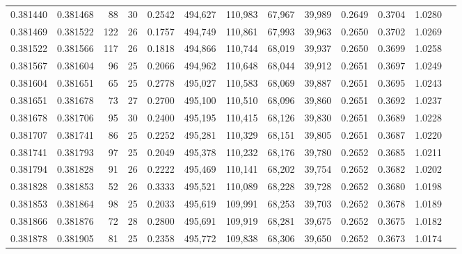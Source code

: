 \begin{tabular}{rrrrrrrrrrrrr}
0.381440 & 0.381468 &    88 &  30 &                                     0.2542 & 494,627 & 110,983 &  67,967 &  39,989 & 0.2649 & 0.3704 & 1.0280 \\
0.381469 & 0.381522 &   122 &  26 &                                     0.1757 & 494,749 & 110,861 &  67,993 &  39,963 & 0.2650 & 0.3702 & 1.0269 \\
0.381522 & 0.381566 &   117 &  26 &                                     0.1818 & 494,866 & 110,744 &  68,019 &  39,937 & 0.2650 & 0.3699 & 1.0258 \\
0.381567 & 0.381604 &    96 &  25 &                                     0.2066 & 494,962 & 110,648 &  68,044 &  39,912 & 0.2651 & 0.3697 & 1.0249 \\
0.381604 & 0.381651 &    65 &  25 &                                     0.2778 & 495,027 & 110,583 &  68,069 &  39,887 & 0.2651 & 0.3695 & 1.0243 \\
0.381651 & 0.381678 &    73 &  27 &                                     0.2700 & 495,100 & 110,510 &  68,096 &  39,860 & 0.2651 & 0.3692 & 1.0237 \\
0.381678 & 0.381706 &    95 &  30 &                                     0.2400 & 495,195 & 110,415 &  68,126 &  39,830 & 0.2651 & 0.3689 & 1.0228 \\
0.381707 & 0.381741 &    86 &  25 &                                     0.2252 & 495,281 & 110,329 &  68,151 &  39,805 & 0.2651 & 0.3687 & 1.0220 \\
0.381741 & 0.381793 &    97 &  25 &                                     0.2049 & 495,378 & 110,232 &  68,176 &  39,780 & 0.2652 & 0.3685 & 1.0211 \\
0.381794 & 0.381828 &    91 &  26 &                                     0.2222 & 495,469 & 110,141 &  68,202 &  39,754 & 0.2652 & 0.3682 & 1.0202 \\
0.381828 & 0.381853 &    52 &  26 &                                     0.3333 & 495,521 & 110,089 &  68,228 &  39,728 & 0.2652 & 0.3680 & 1.0198 \\
0.381853 & 0.381864 &    98 &  25 &                                     0.2033 & 495,619 & 109,991 &  68,253 &  39,703 & 0.2652 & 0.3678 & 1.0189 \\
0.381866 & 0.381876 &    72 &  28 &                                     0.2800 & 495,691 & 109,919 &  68,281 &  39,675 & 0.2652 & 0.3675 & 1.0182 \\
0.381878 & 0.381905 &    81 &  25 &                                     0.2358 & 495,772 & 109,838 &  68,306 &  39,650 & 0.2652 & 0.3673 & 1.0174 \\

\end{tabular}
